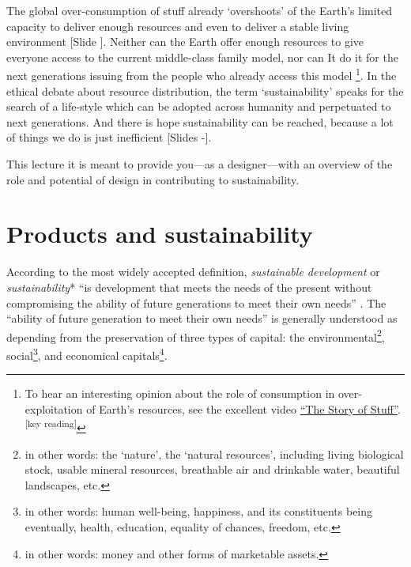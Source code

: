 \documentclass{article}
\newcounter{slide}
\begin{document}
The global over-consumption of stuff already `overshoots' of the Earth's limited capacity to deliver enough resources and even to deliver a stable living environment \cite{rockstromPlanetaryBoundariesExploring2009} {\color{blue}[Slide ]}. Neither can the Earth offer enough resources to give everyone access to the current middle-class family model, nor can It do it for the next generations issuing from the people who already access this model \footnote{To hear an interesting opinion about the role of consumption in over-exploitation of Earth's resources, see the excellent video \href{https://www.youtube.com/watch?v=9GorqroigqM&vl=fr}{``The Story of Stuff''}. \textsuperscript{\color{Magenta}[key reading]}}. In the ethical debate about resource distribution, the term `sustainability' speaks for the search of a life-style which can be adopted across humanity and perpetuated to next generations. And there is hope sustainability can be reached, because a lot of things we do is just inefficient {\color{blue}[Slides -]}.

This lecture it is meant to provide you---as a designer---with an overview of the role and potential of design in contributing to sustainability. 

\section{Products and sustainability}
\label{sec:sustainability}

According to the most widely accepted definition, \emph{sustainable development} or \emph{sustainability}* ``is development that meets the needs of the present without compromising the ability of future generations to meet their own needs'' \cite{brundtland1987our}. The ``ability of future generation to meet their own needs'' is generally understood as depending from the preservation of three types of capital: the environmental\footnote{in other words: the `nature', the `natural resources', including living biological stock, usable mineral resources, breathable air and drinkable water, beautiful landscapes, etc.}, social\footnote{in other words: human well-being, happiness, and its constituents being eventually, health, education, equality of chances, freedom, etc.}, and economical capitals\footnote{in other words: money and other forms of marketable assets.}. 
\end{document}
